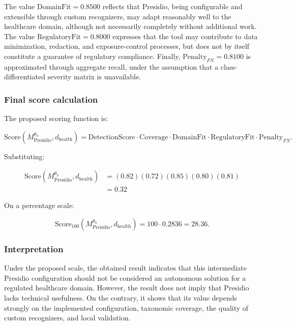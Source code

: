 \documentclass[11pt,a4paper]{article}
\begin{document}
The value \(\mathrm{DomainFit}=0.8500\) reflects that Presidio, being configurable and extensible through custom recognizers, may adapt reasonably well to the healthcare domain, although not necessarily completely without additional work. The value \(\mathrm{RegulatoryFit}=0.8000\) expresses that the tool may contribute to data minimization, redaction, and exposure-control processes, but does not by itself constitute a guarantee of regulatory compliance. Finally, \(\mathrm{Penalty}_{FN}=0.8100\) is approximated through aggregate recall, under the assumption that a class-differentiated severity matrix is unavailable.

\subsubsection{Final score calculation}

The proposed scoring function is:

\begin{equation}
\mathrm{Score}
\left(
M_{\mathrm{Presidio}}^{\theta_h},
d_{\mathrm{health}}
\right)
=
\mathrm{DetectionScore}
\cdot
\mathrm{Coverage}
\cdot
\mathrm{DomainFit}
\cdot
\mathrm{RegulatoryFit}
\cdot
\mathrm{Penalty}_{FN}.
\end{equation}

Substituting:

\begin{equation}
\begin{aligned}
\mathrm{Score}
\left(
M_{\mathrm{Presidio}}^{\theta_h},
d_{\mathrm{health}}
\right)
&=
(0.82)
(0.72)
(0.85)
(0.80)
(0.81)
\\
&=
0.32
\end{aligned}
\end{equation}

On a percentage scale:

\begin{equation}
\mathrm{Score}_{100}
\left(
M_{\mathrm{Presidio}}^{\theta_h},
d_{\mathrm{health}}
\right)
=
100
\cdot
0.2836
=
28.36.
\end{equation}

\subsubsection{Interpretation}

Under the proposed scale, the obtained result indicates that this intermediate Presidio configuration should not be considered an autonomous solution for a regulated healthcare domain. However, the result does not imply that Presidio lacks technical usefulness. On the contrary, it shows that its value depends strongly on the implemented configuration, taxonomic coverage, the quality of custom recognizers, and local validation.
\end{document}
